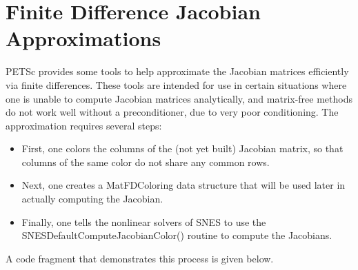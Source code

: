 \section{Finite Difference Jacobian Approximations}
\label{sec_fdmatrix}

PETSc provides some tools to help approximate the Jacobian matrices efficiently via 
finite differences.  These tools are intended for use in certain situations where
one is unable to compute Jacobian matrices analytically, and matrix-free methods
do not work well without a preconditioner, due to very poor conditioning.  
The approximation requires several steps:
\begin{itemize}
\item First, one colors the columns of the (not yet built) Jacobian matrix, so that 
      columns of the same color do not share any common rows.
\item Next, one creates a MatFDColoring data structure that will be used later in 
      actually computing the Jacobian. 
\item Finally, one tells the nonlinear solvers of SNES to use the
      SNESDefaultComputeJacobianColor()
      routine to compute the Jacobians. 
\end{itemize}
A code fragment that demonstrates this process is given below.

